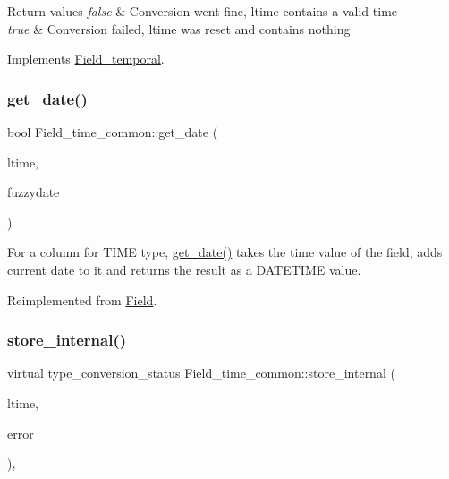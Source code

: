 \begin{DoxyRetVals}{Return values}
{\em false} & Conversion went fine, ltime contains a valid time \\
\hline
{\em true} & Conversion failed, ltime was reset and contains nothing \\
\hline
\end{DoxyRetVals}


Implements \mbox{\hyperlink{classField__temporal_a69d31bd69ced4e4b918cf6c7dfba77f8}{Field\+\_\+temporal}}.

\mbox{\label{classField__time__common_afc75d14f8d4b343aff26653839f08466}} 
\subsubsection{\texorpdfstring{get\+\_\+date()}{get\_date()}}
{\footnotesize\ttfamily bool Field\+\_\+time\+\_\+common\+::get\+\_\+date (\begin{DoxyParamCaption}\item[{M\+Y\+S\+Q\+L\+\_\+\+T\+I\+ME $\ast$}]{ltime,  }\item[{my\+\_\+time\+\_\+flags\+\_\+t}]{fuzzydate }\end{DoxyParamCaption})\hspace{0.3cm}{\ttfamily [virtual]}}

For a column for T\+I\+ME type, \mbox{\hyperlink{classField__time__common_afc75d14f8d4b343aff26653839f08466}{get\+\_\+date()}} takes the time value of the field, adds current date to it and returns the result as a D\+A\+T\+E\+T\+I\+ME value. 

Reimplemented from \mbox{\hyperlink{classField}{Field}}.

\mbox{\label{classField__time__common_a86071ced0943d9626dd07e2cdf387875}} 
\subsubsection{\texorpdfstring{store\+\_\+internal()}{store\_internal()}}
{\footnotesize\ttfamily virtual type\+\_\+conversion\+\_\+status Field\+\_\+time\+\_\+common\+::store\+\_\+internal (\begin{DoxyParamCaption}\item[{const M\+Y\+S\+Q\+L\+\_\+\+T\+I\+ME $\ast$}]{ltime,  }\item[{int $\ast$}]{error }\end{DoxyParamCaption})\hspace{0.3cm}{\ttfamily [protected]}, {}}

